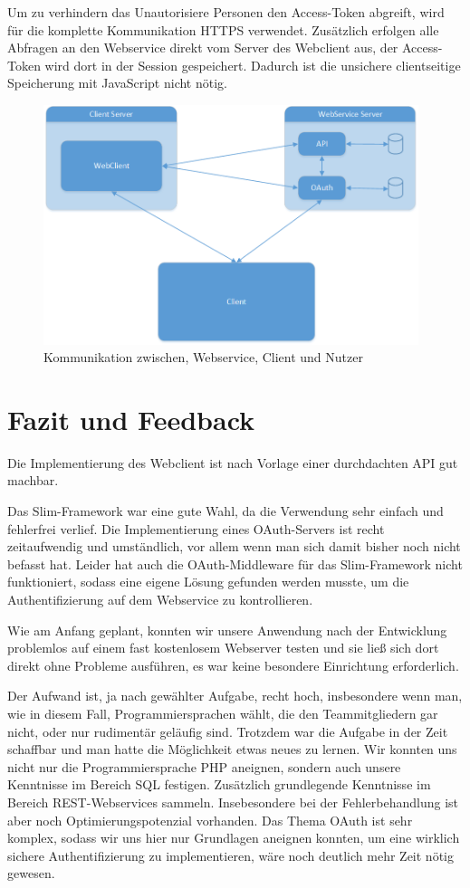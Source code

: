Um zu verhindern das Unautorisiere Personen den Access-Token abgreift, wird für die komplette Kommunikation HTTPS verwendet. Zusätzlich erfolgen alle Abfragen an den Webservice direkt vom Server des Webclient aus, der Access-Token wird dort in der Session gespeichert. Dadurch ist die unsichere clientseitige Speicherung mit JavaScript nicht nötig.

\begin{figure}[h]
        \centering
	\includegraphics[height=70mm]{pics/Architektur.png}
	\caption{Kommunikation zwischen, Webservice, Client und Nutzer}
\end{figure}\label{oauth}

\chapter{Fazit und Feedback}

Die Implementierung des Webclient ist nach Vorlage einer durchdachten API gut machbar.

Das Slim-Framework war eine gute Wahl, da die Verwendung sehr einfach und fehlerfrei verlief. Die Implementierung eines OAuth-Servers ist recht zeitaufwendig und umständlich, vor allem wenn man sich damit bisher noch nicht befasst hat. Leider hat auch die OAuth-Middleware für das Slim-Framework nicht funktioniert, sodass eine eigene Lösung gefunden werden musste, um die Authentifizierung auf dem Webservice zu kontrollieren.

Wie am Anfang geplant, konnten wir unsere Anwendung nach der Entwicklung problemlos auf einem fast kostenlosem Webserver testen und sie ließ sich dort direkt ohne Probleme ausführen, es war keine besondere Einrichtung erforderlich. 

Der Aufwand ist, ja nach gewählter Aufgabe, recht hoch, insbesondere wenn man, wie in diesem Fall, Programmiersprachen wählt, die den Teammitgliedern gar nicht, oder nur rudimentär geläufig sind. Trotzdem war die Aufgabe in der Zeit schaffbar und man hatte die Möglichkeit etwas neues zu lernen. Wir konnten uns nicht nur die Programmiersprache PHP aneignen, sondern auch unsere Kenntnisse im Bereich SQL festigen. Zusätzlich grundlegende Kenntnisse im Bereich REST-Webservices sammeln. Insebesondere bei der Fehlerbehandlung ist aber noch Optimierungspotenzial vorhanden. Das Thema OAuth ist sehr komplex, sodass wir uns hier nur Grundlagen aneignen konnten, um eine wirklich sichere Authentifizierung zu implementieren, wäre noch deutlich mehr Zeit nötig gewesen.

